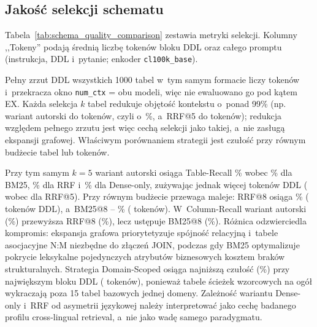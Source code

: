 \subsection{Jakość selekcji schematu}

Tabela~\ref{tab:schema_quality_comparison} zestawia metryki selekcji. Kolumny ,,Tokeny'' podają średnią liczbę tokenów bloku DDL oraz całego promptu (instrukcja, DDL i~pytanie; enkoder \texttt{cl100k\_base}).

\begin{table}[htbp]
\centering
\small
\caption[Jakość selekcji schematu i objętość kontekstu ($N = 500$)]{Jakość selekcji schematu i~objętość kontekstu dla badanych strategii ($N = \wynNQueries$; średnie po zapytaniach)}
\label{tab:schema_quality_comparison}
\end{table}

Pełny zrzut DDL wszystkich 1000 tabel w~tym samym formacie liczy \wynFullDumpTokens{} tokenów i~przekracza okno \texttt{num\_ctx} = \wynNumCtx{} obu modeli, więc nie ewaluowano go pod kątem EX. Każda selekcja $k$ tabel redukuje objętość kontekstu o~ponad 99\% (np. wariant autorski do \wynDdlGraphFive{} tokenów, czyli o~\wynReductionVsFull\%, a~RRF@5 do \wynDdlRrfFive{} tokenów); redukcja względem pełnego zrzutu jest więc cechą selekcji jako takiej, a~nie zasługą ekspansji grafowej. Właściwym porównaniem strategii jest czułość przy równym budżecie tabel lub tokenów.

Przy tym samym $k = 5$ wariant autorski osiąga Table-Recall \wynRecallGraphFive\% wobec \wynRecallBmFive\% dla BM25, \wynRecallRrfFive\% dla RRF i~\wynRecallDenseFive\% dla Dense-only, zużywając jednak więcej tokenów DDL (\wynDdlGraphFive{} wobec \wynDdlRrfFive{} dla RRF@5). Przy równym budżecie przewaga maleje: RRF@8 osiąga \wynRecallRrfEight\% (\wynDdlRrfEight{} tokenów DDL), a~BM25@8 -- \wynRecallBmEight\% (\wynDdlBmEight{} tokenów). W~Column-Recall wariant autorski (\wynColRecallGraphFive\%) przewyższa RRF@8 (\wynColRecallRrfEight\%), lecz ustępuje BM25@8 (\wynColRecallBmEight\%). Różnica odzwierciedla kompromis: ekspansja grafowa priorytetyzuje spójność relacyjną i~tabele asocjacyjne N:M niezbędne do złączeń JOIN, podczas gdy BM25 optymalizuje pokrycie leksykalne pojedynczych atrybutów biznesowych kosztem braków strukturalnych. Strategia Domain-Scoped osiąga najniższą czułość (\wynRecallDomain\%) przy największym bloku DDL (\wynDdlDomain{} tokenów), ponieważ tabele ścieżek wzorcowych na ogół wykraczają poza 15 tabel bazowych jednej domeny. Zależność wariantu Dense-only i~RRF od asymetrii językowej należy interpretować jako cechę badanego profilu cross-lingual retrieval, a~nie jako wadę samego paradygmatu.


